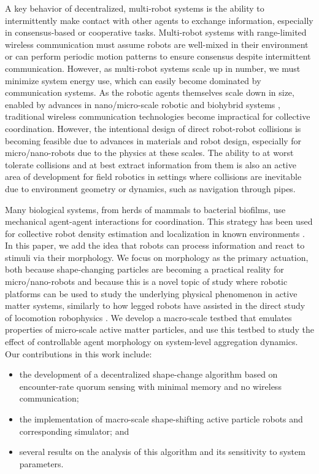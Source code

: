 \documentclass[runningheads]{llncs}
\begin{document}
A key behavior of decentralized, multi-robot systems is the ability to intermittently make contact with other agents to exchange information, especially in consensus-based or cooperative tasks. Multi-robot systems with range-limited wireless communication must assume robots are well-mixed in their environment \cite{edwards2023collaborative} or can perform periodic motion patterns \cite{yu2021resilient} to ensure consensus despite intermittent communication. However, as multi-robot systems scale up in number, we must minimize system energy use, which can easily become dominated by communication systems. As the robotic agents themselves scale down in size, enabled by advances in nano/micro-scale robotic and biohybrid systems \cite{wang2021trends}, traditional wireless communication technologies become impractical for collective coordination. However, the intentional design of direct robot-robot collisions is becoming feasible due to advances in materials and robot design, especially for micro/nano-robots due to the physics at these scales. The ability to at worst tolerate collisions and at best extract information from them is also an active area of development for field robotics in settings where collisions are inevitable due to environment geometry or dynamics, such as navigation through pipes.

Many biological systems, from herds of mammals to bacterial biofilms, use mechanical agent-agent interactions for coordination. This strategy has been used for collective robot density estimation and localization in known environments \cite{mayya2018localization,mayya2019closed}. In this paper, we add the idea that robots can process information and react to stimuli via their morphology. We focus on morphology as the primary actuation, both because shape-changing particles are becoming a practical reality for micro/nano-robots \cite{tanjeem2022shape,tan2023shape} and because this is a novel topic of study where robotic platforms can be used to study the underlying physical phenomenon in active matter systems, similarly to how legged robots have assisted in the direct study of locomotion robophysics \cite{aguilar2016review}. We develop a macro-scale testbed that emulates properties of micro-scale active matter particles, and use this testbed to study the effect of controllable agent morphology on system-level aggregation dynamics. Our contributions in this work include:

\begin{itemize}
\item the development of a decentralized shape-change algorithm based on encounter-rate quorum sensing with minimal memory and no wireless communication;
\item the implementation of macro-scale shape-shifting active particle robots and corresponding simulator; and
\item several results on the analysis of this algorithm and its sensitivity to system parameters.
\end{itemize}
\end{document}
